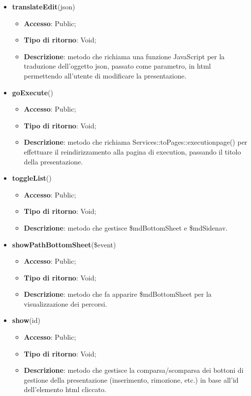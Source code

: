 {{	\begin{itemize}
		\item \textbf{translateEdit}(json)
		\begin{itemize}
			\item \textbf{Accesso}: Public;
			\item \textbf{Tipo di ritorno}: Void;
			\item \textbf{Descrizione}: metodo che richiama una funzione JavaScript per la traduzione dell'oggetto json, passato come parametro, in html permettendo all'utente di modificare la presentazione.
		\end{itemize}
		\item \textbf{goExecute}()
		\begin{itemize}
			\item \textbf{Accesso}: Public;
			\item \textbf{Tipo di ritorno}: Void;
			\item \textbf{Descrizione}: metodo che richiama Services::\-toPages::\-executionpage() per effettuare il reindirizzamento alla pagina di execution, passando il titolo della presentazione.
		\end{itemize}
		\item \textbf{toggleList}()
		\begin{itemize}
			\item \textbf{Accesso}: Public;
			\item \textbf{Tipo di ritorno}: Void;
			\item \textbf{Descrizione}: metodo che gestisce \$mdBottomSheet e \$mdSidenav.
		\end{itemize}
		\item \textbf{showPathBottomSheet}(\$event)
		\begin{itemize}
			\item \textbf{Accesso}: Public;
			\item \textbf{Tipo di ritorno}: Void;
			\item \textbf{Descrizione}: metodo che fa apparire \$mdBottomSheet per la visualizzazione dei percorsi.
		\end{itemize}
		\item \textbf{show}(id)
		\begin{itemize}
			\item \textbf{Accesso}: Public;
			\item \textbf{Tipo di ritorno}: Void;
			\item \textbf{Descrizione}: metodo che gestisce la comparsa/scomparsa dei bottoni di gestione della presentazione (inserimento, rimozione, etc.) in base all'id dell'elemento html cliccato.

\end{itemize}
\end{itemize}}}
